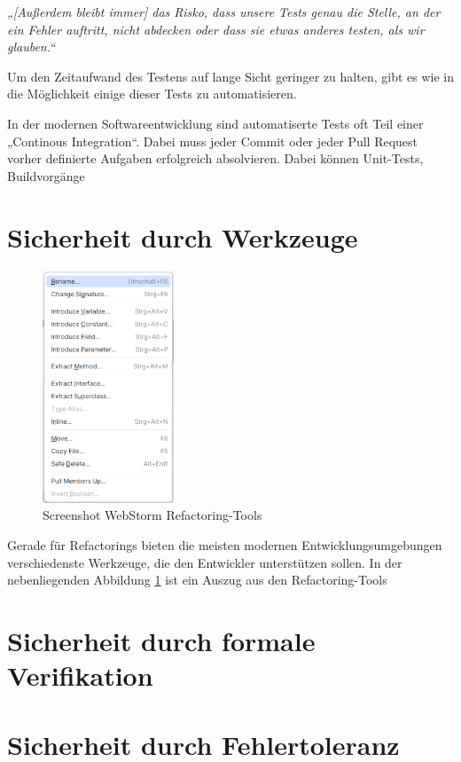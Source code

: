 \textit{„[Außerdem bleibt immer] das Risko, dass unsere Tests genau die Stelle, an der ein Fehler auftritt, nicht abdecken oder dass sie etwas anderes testen, als wir glauben.“} \citep[S. 323]{fiveLines.2023}
\par
Um den Zeitaufwand des Testens auf lange Sicht geringer zu halten, gibt es wie in \citep[S. 323]{fiveLines.2023} die Möglichkeit einige dieser Tests zu automatisieren.
\par
In der modernen Softwareentwicklung sind automatiserte Tests oft Teil einer „Continous Integration“. Dabei muss jeder Commit oder jeder Pull Request vorher definierte Aufgaben erfolgreich absolvieren. Dabei können Unit-Tests, Buildvorgänge \cite{CIMeyer.2014}
\section{Sicherheit durch Werkzeuge}
\begin{figure}
  \centering
  \includegraphics[width=0.35\textwidth]{Bilder/screenshotWebstorm} %
  \caption{Screenshot WebStorm Refactoring-Tools \cite{webstorm.2024}}
  \label{webstormRefactor}
\end{figure}
Gerade für Refactorings bieten die meisten modernen Entwicklungsumgebungen verschiedenste Werkzeuge, die den Entwickler unterstützen sollen. In der nebenliegenden Abbildung \ref{webstormRefactor} ist ein Auszug aus den Refactoring-Tools 
\section{Sicherheit durch formale Verifikation}
\section{Sicherheit durch Fehlertoleranz}